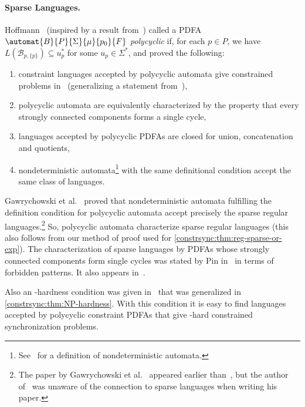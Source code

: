 
\paragraph{Sparse Languages.} 
Hoffmann~\cite{DBLP:conf/ictcs/Hoffman20} (inspired 
by a result from~\cite[Thm.~19]{FernauGHHVW19}) 
called a PDFA $\automat{B}{P}{\Sigma}{\mu}{p_0}{F}$  \emph{polycyclic} 
if, for each $p \in P$, we have
$L(\mathcal B_{p,\{p\}}) \subseteq u_p^*$ for some $u_p \in \Sigma^*$,
and proved the following:
\begin{enumerate}
\item constraint languages accepted by polycyclic automata give
 constrained problems in \NP\ (generalizing a statement from~\cite[Thm. 19]{FernauGHHVW19}),
  		
\item polycyclic automata are equivalently characterized by the property
 that every strongly connected components forms a single cycle,
\item languages accepted by polycyclic PDFAs are closed for union, concatenation
 and quotients,
 
\item nondeterministic automata\footnote{See~\cite{HopUll79} for a definition of nondeterministic automata.} 
 with the same definitional condition accept the same class of languages.
\end{enumerate}
Gawrychowski et al.~\cite[Lem.~2]{DBLP:journals/ijfcs/GawrychowskiKRS10} 
proved that nondeterministic automata fulfilling
the definition condition for polycyclic automata
accept precisely the sparse regular languages.\footnote{The paper by Gawrychowski et al.~\cite{DBLP:journals/ijfcs/GawrychowskiKRS10} 
appeared earlier than~\cite{DBLP:conf/ictcs/Hoffman20},
but the author of~\cite{DBLP:conf/ictcs/Hoffman20} was unaware of the connection to sparse languages
when writing his paper.}  
So, polycyclic automata characterize sparse regular languages (this also follows
from our method of proof used for \cref{constrsync:thm:reg-sparse-or-exp}). 
The characterization of sparse languages
by PDFAs whose strongly connected components form single cycles
was stated by Pin in~\cite[Sec.~XII.4.2]{Pin2022} in terms of forbidden patterns. It also appears
in~\cite[Lem.~5.4]{DBLP:conf/stacs/GanardiHKLM18}.

Also an \NP-hardness condition was given in~\cite[Prop.~8]{DBLP:conf/ictcs/Hoffman20}
that was generalized in \cref{constrsync:thm:NP-hardness}. With this condition it is easy
to find languages accepted by polycyclic constraint PDFAs that give \NP-hard
constrained synchronization problems.


